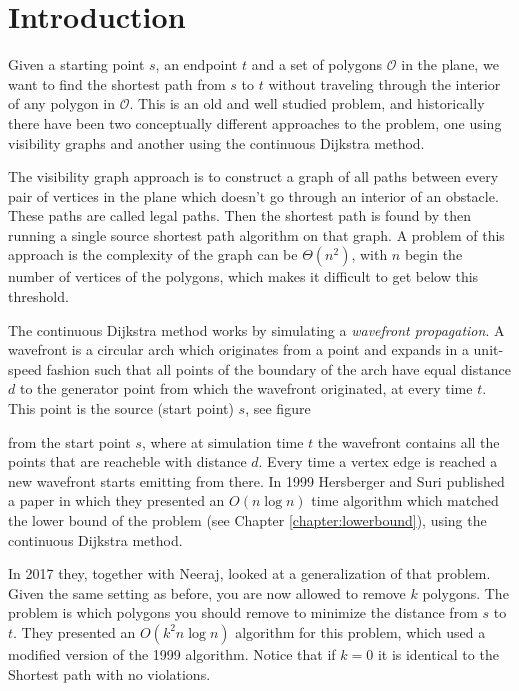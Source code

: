 \chapter{Introduction} Given a starting point $s$, an endpoint $t$ and a set of
polygons $\mathcal{O}$ in the plane, we want to find the shortest path from $s$ to $t$ 
without traveling through the interior of any polygon in $\mathcal{O}$. 
This is an old and well studied problem, and historically there have been two
conceptually different approaches to the problem, one using visibility graphs and
another using the continuous Dijkstra method. 

The visibility graph approach is to construct a graph of all paths between every pair 
of vertices in the plane which doesn't go through an interior of an obstacle. 
These paths are called legal paths. Then the shortest path is found by then running a 
single source shortest path algorithm on that graph. A problem of this approach
is the complexity of the graph can be $\Theta(n^2)$, with $n$ begin the number of vertices of the polygons,
which makes it difficult to get below this threshold. 

The continuous Dijkstra method works by simulating a \emph{wavefront propagation}.
A wavefront is a circular arch which originates from a point and expands in a unit-speed
fashion such that all points of the boundary of the arch have equal distance $d$ to the 
generator point from which the wavefront originated, at every time $t$. 
This point is the source (start point) $s$, see figure 


 from the start point $s$, where
at simulation time $t$ the wavefront contains all the points that are reacheble
with distance $d$.  Every time a vertex edge is reached a new wavefront starts
emitting from there. In 1999 Hersberger and Suri published a
paper\cite{HershbergerS99} in which they presented an $O(n\log n)$ time
algorithm which matched the lower bound of the problem (see
Chapter \ref{chapter:lowerbound}), using the continuous
Dijkstra method.

In 2017 they, together with Neeraj, looked at a generalization of that problem.
Given the same setting as before, you are now allowed to remove $k$ polygons.
The problem is which polygons you should remove to minimize the distance from $s$ to $t$. They
presented an $O(k^2 n\log n)$ algorithm for this problem, which used a modified
version of the 1999 algorithm\cite{HershbergerKS17}. 
Notice that if $k=0$ it is identical to the Shortest path with no violations.

